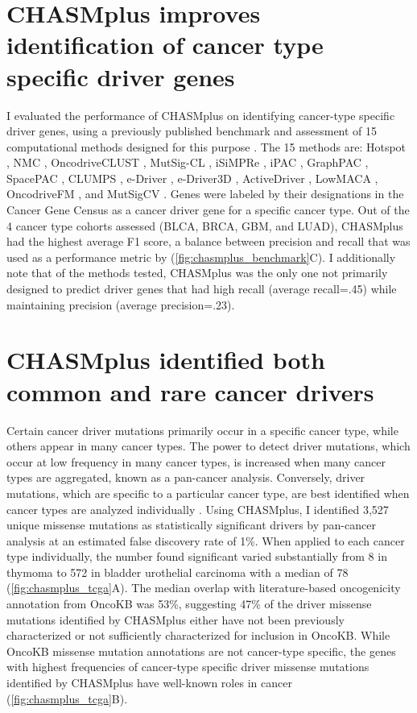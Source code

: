 \section{CHASMplus improves identification of cancer type specific driver genes}
I evaluated the performance of CHASMplus on identifying cancer-type specific driver genes, using a previously published benchmark and assessment of 15 computational methods designed for this purpose \cite{RN52}. The 15 methods are: Hotspot \cite{RN16}, NMC \cite{RN106}, OncodriveCLUST \cite{RN54}, MutSig-CL \cite{RN14}, iSiMPRe \cite{RN150}, iPAC \cite{RN15}, GraphPAC \cite{RN151}, SpacePAC \cite{RN152}, CLUMPS \cite{RN105}, e-Driver \cite{RN153}, e-Driver3D \cite{RN45}, ActiveDriver \cite{RN154}, LowMACA \cite{RN155}, OncodriveFM \cite{RN53}, and MutSigCV \cite{RN13}. Genes were labeled by their designations in the Cancer Gene Census as a cancer driver gene for a specific cancer type. Out of the 4 cancer type cohorts assessed (BLCA, BRCA, GBM, and LUAD), CHASMplus had the highest average F1 score, a balance between precision and recall that was used as a performance metric by \cite{RN52} (\autoref{fig:chasmplus_benchmark}C). I additionally note that of the methods tested, CHASMplus was the only one not primarily designed to predict driver genes that had high recall (average recall=.45) while maintaining precision (average precision=.23). 

\section{CHASMplus identified both common and rare cancer drivers}

Certain cancer driver mutations primarily occur in a specific cancer type, while others appear in many cancer types.  The power to detect driver mutations, which occur at low frequency in many cancer types, is increased when many cancer types are aggregated, known as a pan-cancer analysis. Conversely, driver mutations, which are specific to a particular cancer type, are best identified when cancer types are analyzed individually \cite{RN59}. Using CHASMplus, I identified 3,527 unique missense mutations as statistically significant drivers by pan-cancer analysis at an estimated false discovery rate of 1\%. When applied to each cancer type individually, the number found significant varied substantially from 8 in thymoma to 572 in bladder urothelial carcinoma with a median of 78 (\autoref{fig:chasmplus_tcga}A). The median overlap with literature-based oncogenicity annotation from OncoKB was 53\%, suggesting 47\% of the driver missense mutations identified by CHASMplus either have not been previously characterized or not sufficiently characterized for inclusion in OncoKB.  While OncoKB missense mutation annotations are not cancer-type specific, the genes with highest frequencies of cancer-type specific driver missense mutations identified by CHASMplus have well-known roles in cancer \cite{RN5} (\autoref{fig:chasmplus_tcga}B). 

